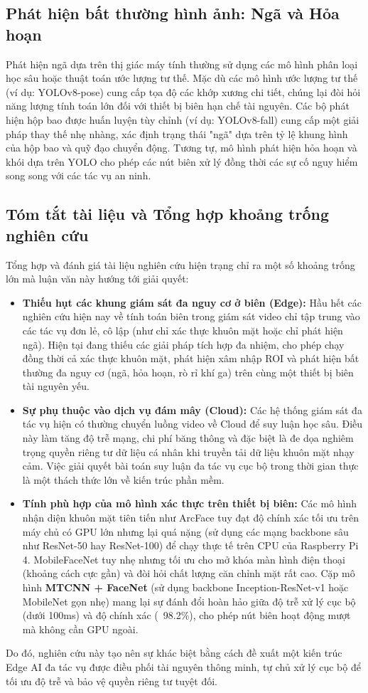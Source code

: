\documentclass[12pt,a4paper]{article}
\begin{document}
\subsection{Phát hiện bất thường hình ảnh: Ngã và Hỏa hoạn}
Phát hiện ngã dựa trên thị giác máy tính thường sử dụng các mô hình phân loại học sâu hoặc thuật toán ước lượng tư thế. Mặc dù các mô hình ước lượng tư thế (ví dụ: YOLOv8-pose) cung cấp tọa độ các khớp xương chi tiết, chúng lại đòi hỏi năng lượng tính toán lớn đối với thiết bị biên hạn chế tài nguyên. Các bộ phát hiện hộp bao được huấn luyện tùy chỉnh (ví dụ: YOLOv8-fall) cung cấp một giải pháp thay thế nhẹ nhàng, xác định trạng thái "ngã" dựa trên tỷ lệ khung hình của hộp bao và quỹ đạo chuyển động. Tương tự, mô hình phát hiện hỏa hoạn và khói dựa trên YOLO cho phép các nút biên xử lý đồng thời các sự cố nguy hiểm song song với các tác vụ an ninh.

\subsection{Tóm tắt tài liệu và Tổng hợp khoảng trống nghiên cứu}
Tổng hợp và đánh giá tài liệu nghiên cứu hiện trạng chỉ ra một số khoảng trống lớn mà luận văn này hướng tới giải quyết:
\begin{itemize}
    \item \textbf{Thiếu hụt các khung giám sát đa nguy cơ ở biên (Edge):} Hầu hết các nghiên cứu hiện nay về tính toán biên trong giám sát video chỉ tập trung vào các tác vụ đơn lẻ, cô lập (như chỉ xác thực khuôn mặt hoặc chỉ phát hiện ngã). Hiện tại đang thiếu các giải pháp tích hợp đa nhiệm, cho phép chạy đồng thời cả xác thực khuôn mặt, phát hiện xâm nhập ROI và phát hiện bất thường đa nguy cơ (ngã, hỏa hoạn, rò rỉ khí ga) trên cùng một thiết bị biên tài nguyên yếu.
    \item \textbf{Sự phụ thuộc vào dịch vụ đám mây (Cloud):} Các hệ thống giám sát đa tác vụ hiện có thường chuyển luồng video về Cloud để suy luận học sâu. Điều này làm tăng độ trễ mạng, chi phí băng thông và đặc biệt là đe dọa nghiêm trọng quyền riêng tư dữ liệu cá nhân khi truyền tải dữ liệu khuôn mặt nhạy cảm. Việc giải quyết bài toán suy luận đa tác vụ cục bộ trong thời gian thực là một thách thức lớn về kiến trúc phần mềm.
    \item \textbf{Tính phù hợp của mô hình xác thực trên thiết bị biên:} Các mô hình nhận diện khuôn mặt tiên tiến như ArcFace \cite{arcface_2019} tuy đạt độ chính xác tối ưu trên máy chủ có GPU lớn nhưng lại quá nặng (sử dụng các mạng backbone sâu như ResNet-50 hay ResNet-100) để chạy thực tế trên CPU của Raspberry Pi 4. MobileFaceNet tuy nhẹ nhưng tối ưu cho mở khóa màn hình điện thoại (khoảng cách cực gần) và đòi hỏi chất lượng căn chỉnh mặt rất cao. Cặp mô hình \textbf{MTCNN + FaceNet} (sử dụng backbone Inception-ResNet-v1 hoặc MobileNet gọn nhẹ) mang lại sự đánh đổi hoàn hảo giữa độ trễ xử lý cục bộ (dưới 100ms) và độ chính xác (~98.2\%), cho phép nút biên hoạt động mượt mà không cần GPU ngoài.
\end{itemize}
Do đó, nghiên cứu này tạo nên sự khác biệt bằng cách đề xuất một kiến trúc Edge AI đa tác vụ được điều phối tài nguyên thông minh, tự chủ xử lý cục bộ để tối ưu độ trễ và bảo vệ quyền riêng tư tuyệt đối.
\end{document}
